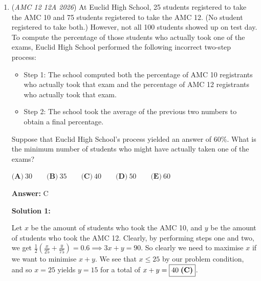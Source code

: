 \begin{enumerate}
 



\textbf{Solution 6 (Similar to Others)}

Firstly, in order to make the coefficients of 1 and $i$ the same we \textit{must} require that $\cos$ and $\sin$ are the same. This happens when $\theta = \frac{\pi}{4}$. Thus, considering $re^{i \theta}$, we see both expressions evaluate to $\sqrt{2} \cdot e^{i \frac{\pi}{4}}$ and $\sqrt{2} \cdot e^{i \frac{-\pi}{4}}$ respectively. Thus we have

 
 \[(\sqrt{2} e^{i \frac{\pi}{4}})^{20} + (\sqrt{2} e^{i \frac{-\pi}{4}})^{20}\]
 \[2^{10} e^{i5\pi} + 2^{10} e^{-i5\pi}\]
 \[-2^{10} - 2^{10}\]
 \[-1024-1024\]
 \[= \boxed{-2048}.\]



	\item (\textit{AMC 12 12A 2026}) At Euclid High School, 25 students registered to take the AMC 10 and 75 students registered to take the AMC 12. (No student registered to take both.) However, not all 100 students showed up on test day. To compute the percentage of those students who actually took one of the exams, Euclid High School performed the following incorrect two-step process:


 
            \begin{itemize}
        \item Step 1: The school computed both the percentage of AMC 10 registrants who actually took that exam and the percentage of AMC 12 registrants who actually took that exam.
            \end{itemize}
            
            \begin{itemize}
        \item Step 2: The school took the average of the previous two numbers to obtain a final percentage.
            \end{itemize}
            Suppose that Euclid High School's process yielded an answer of $60\%$. What is the minimum number of students who might have actually taken one of the exams?


 $\textbf{(A)}\   30  \qquad 	\textbf{(B)}\   35  \qquad 	\textbf{(C)}\   40  \qquad 	\textbf{(D)}\   50  \qquad 	\textbf{(E)}\   60$

 \textbf{Answer: }C



\textbf{Solution 1:}

Let $x$ be the amount of students who took the AMC 10, and $y$ be the amount of students who took the AMC 12. Clearly, by performing steps one and two, we get $\frac12\left(\frac{x}{25}+\frac{y}{75}\right)=0.6\implies 3x+y=90$. So clearly we need to maximise $x$ if we want to minimise $x+y$. We see that $x\le 25$ by our problem condition, and so $x=25$ yields $y=15$ for a total of $x+y=\boxed{40 \hspace{1mm}\textbf{(C)}}$.


\end{enumerate}
